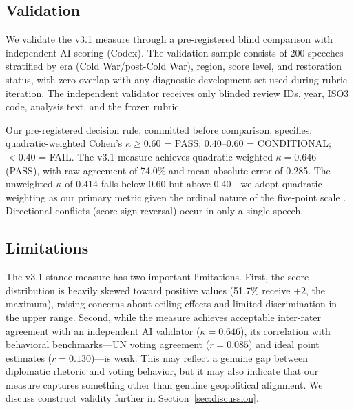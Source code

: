 \subsection{Validation}

We validate the v3.1 measure through a pre-registered blind comparison with independent AI scoring (Codex). The validation sample consists of 200 speeches stratified by era (Cold War/post-Cold War), region, score level, and restoration status, with zero overlap with any diagnostic development set used during rubric iteration. The independent validator receives only blinded review IDs, year, ISO3 code, analysis text, and the frozen rubric.

Our pre-registered decision rule, committed before comparison, specifies: quadratic-weighted Cohen's $\kappa \geq 0.60$ = PASS; $0.40$--$0.60$ = CONDITIONAL; $<0.40$ = FAIL. The v3.1 measure achieves quadratic-weighted $\kappa = 0.646$ (PASS), with raw agreement of 74.0\% and mean absolute error of 0.285. The unweighted $\kappa$ of 0.414 falls below 0.60 but above 0.40---we adopt quadratic weighting as our primary metric given the ordinal nature of the five-point scale \citep{fleiss1973equivalence}. Directional conflicts (score sign reversal) occur in only a single speech.

\subsection{Limitations}

The v3.1 stance measure has two important limitations. First, the score distribution is heavily skewed toward positive values (51.7\% receive $+2$, the maximum), raising concerns about ceiling effects and limited discrimination in the upper range. Second, while the measure achieves acceptable inter-rater agreement with an independent AI validator ($\kappa=0.646$), its correlation with behavioral benchmarks---UN voting agreement ($r=0.085$) and ideal point estimates ($r=0.130$)---is weak. This may reflect a genuine gap between diplomatic rhetoric and voting behavior, but it may also indicate that our measure captures something other than genuine geopolitical alignment. We discuss construct validity further in Section~\ref{sec:discussion}.

